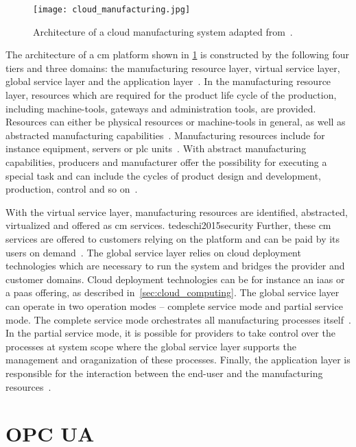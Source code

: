 \documentclass[
a4paper,
twoside,
headsepline,
cleardoublepage=empty,
parskip=half,
draft=false
]{scrbook}
\begin{document}
			\begin{figure}[htbp]
				\centering
				\texttt{[image: cloud\_manufacturing.jpg]}
				\caption{Architecture of a cloud manufacturing system adapted from~\cite{xu2012cloud}.}
				\label{fig:cloud_manufacturing}
			\end{figure}

			The architecture of a \gls{cm} platform shown in \cref{fig:cloud_manufacturing} is constructed by the following four tiers and three domains: the manufacturing resource layer, virtual service layer, global service layer and the application layer~\cite{wu2013cloud}.
			In the manufacturing resource layer, resources which are required for the product life cycle of the production, including machine-tools, gateways and administration tools, are provided.
			Resources can either be physical resources or machine-tools in general, as well as abstracted manufacturing capabilities~\cite{kleinemeier2014automatisierungspyramide}.
			Manufacturing resources include for instance equipment, servers or \gls{plc} units~\cite{xu2012cloud}.
			With abstract manufacturing capabilities, producers and manufacturer offer the possibility for executing a special task and can include the cycles of product design and development, production, control and so on~\cite{he2015state}.

			With the virtual service layer, manufacturing resources are identified, abstracted, virtualized and offered as \gls{cm} services. tedeschi2015security
			Further, these \gls{cm} services are offered to customers relying on the platform and can be paid by its users on demand~\cite{tedeschi2015security}.
			The global service layer relies on cloud deployment technologies which are necessary to run the system and bridges the provider and customer domains.
			Cloud deployment technologies can be for instance an \gls{iaas} or a \gls{paas} offering, as described in~\cref{sec:cloud_computing}.
			The global service layer can operate in two operation modes -- complete service mode and partial service mode.
			The complete service mode orchestrates all manufacturing processes itself~\cite{xu2012cloud}.
			In the partial service mode, it is possible for providers to take control over the processes at system scope where the global service layer supports the management and oraganization of these processes.
			Finally, the application layer is responsible for the interaction between the end-user and the manufacturing resources~\cite{xu2012cloud}.

		\section{OPC UA} \label{sec:opc_ua}
\end{document}
